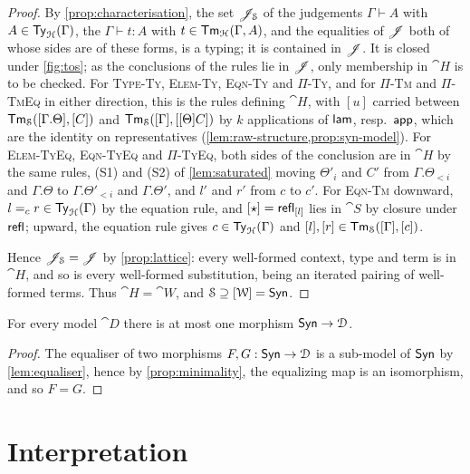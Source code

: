 \begin{proof}
    By \cref{prop:characterisation}, the set $\mathscr{J}_{\mathcal{S}}$ of the judgements $\Gamma \vdash A$ with $A \in \mathsf{Ty}_{\mathcal{H}}(\Gamma)$, the $\Gamma \vdash t : A$ with $t \in \mathsf{Tm}_{\mathcal{H}}(\Gamma, A)$, and the equalities of $\mathscr{J}$ both of whose sides are of these forms, is a typing; it is contained in $\mathscr{J}$. It is closed under \cref{fig:tos}; as the conclusions of the rules lie in $\mathscr{J}$, only membership in $\cat{H}$ is to be checked. For \textsc{Type-Ty}, \textsc{Elem-Ty}, \textsc{Eqn-Ty} and \textsc{$\Pi$-Ty}, and for \textsc{$\Pi$-Tm} and \textsc{$\Pi$-TmEq} in either direction, this is the rules defining $\cat{H}$, with $[u]$ carried between $\mathsf{Tm}_{\mathcal{S}}([\Gamma.\Theta], [C])$ and $\mathsf{Tm}_{\mathcal{S}}([\Gamma], [[\Theta]C])$ by $k$ applications of $\mathsf{lam}$, resp.\ $\mathsf{app}$, which are the identity on representatives (\cref{lem:raw-structure,prop:syn-model}). For \textsc{Elem-TyEq}, \textsc{Eqn-TyEq} and \textsc{$\Pi$-TyEq}, both sides of the conclusion are in $\cat{H}$ by the same rules, (S1) and (S2) of \cref{lem:saturated} moving $\Theta'_i$ and $C'$ from $\Gamma.\Theta_{<i}$ and $\Gamma.\Theta$ to $\Gamma.\Theta'_{<i}$ and $\Gamma.\Theta'$, and $l'$ and $r'$ from $c$ to $c'$. For \textsc{Eqn-Tm} downward, $l =_c r \in \mathsf{Ty}_{\mathcal{H}}(\Gamma)$ by the equation rule, and $[\star] = \mathsf{refl}_{[l]}$ lies in $\cat{S}$ by closure under $\mathsf{refl}$; upward, the equation rule gives $c \in \mathsf{Ty}_{\mathcal{H}}(\Gamma)$ and $[l], [r] \in \mathsf{Tm}_{\mathcal{S}}([\Gamma], [c])$.

    Hence $\mathscr{J}_{\mathcal{S}} = \mathscr{J}$ by \cref{prop:lattice}: every well-formed context, type and term is in $\cat{H}$, and so is every well-formed substitution, being an iterated pairing of well-formed terms. Thus $\cat{H} = \cat{W}$, and $\mathcal{S} \supseteq [\mathcal{W}] = \mathsf{Syn}$.
\end{proof}

\begin{corollary}\label{cor:uniqueness}
    For every model $\cat{D}$ there is at most one morphism $\mathsf{Syn} \to \mathcal{D}$.
\end{corollary}

\begin{proof}
    The equaliser of two morphisms $F,G : \mathsf{Syn} \to \mathcal{D}$ is a sub-model of $\mathsf{Syn}$ by \cref{lem:equaliser}, hence by \cref{prop:minimality}, the equalizing map is an isomorphism, and so $F = G$.
\end{proof}

\section{Interpretation}
\label{sec:interpretation}

